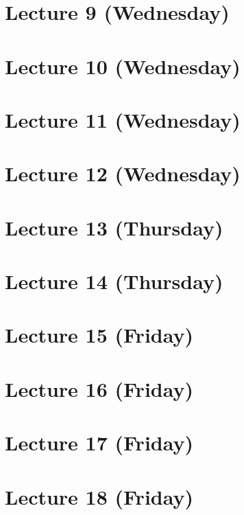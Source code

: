 \documentclass[12pt]{amsart}
\begin{document}
\section{Lecture 9 (Wednesday)}


\section{Lecture 10 (Wednesday)}


\section{Lecture 11 (Wednesday)}


\section{Lecture 12 (Wednesday)}


\section{Lecture 13 (Thursday)}


\section{Lecture 14 (Thursday)}


\section{Lecture 15 (Friday)}
% 

\section{Lecture 16 (Friday)}
% 

\section{Lecture 17 (Friday)}
% 

\section{Lecture 18 (Friday)}
% 
\end{document}
